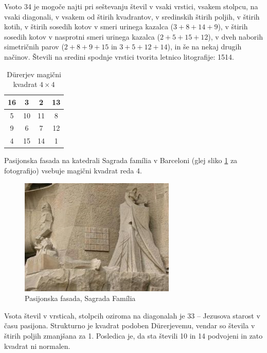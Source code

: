 \documentclass[a4paper,12pt]{article}
\theoremstyle{definition}
\begin{document}
Vsoto 34 je mogoče najti pri seštevanju števil v vsaki vrstici, vsakem stolpcu,
na vsaki diagonali, v vsakem od štirih kvadrantov, v sredinskih štirih poljih,
v štirih kotih, v štirih sosedih kotov v smeri urinega kazalca ($3+8+14+9$), v
štirih sosedih kotov v nasprotni smeri urinega kazalca ($2+5+15+12$), v dveh naborih
simetričnih parov ($2+8+9+15$ in $3+5+12+14$), in še na nekaj drugih načinov.
Števili na sredini spodnje vrstici tvorita letnico litografije: 1514.
%
\begin{table}[h!]
   \centering
   \caption{Dürerjev magični kvadrat $4\times 4$}
   \label{durer}
   \begin{tabular}{|c|c|c|c|}
      \hline
      16 &  3 &  2 & 13 \\\hline
       5 & 10 & 11 &  8 \\\hline
       9 &  6 &  7 & 12 \\\hline
       4 & 15 & 14 &  1 \\\hline
   \end{tabular}
\end{table}

Pasijonska fasada na katedrali Sagrada família v Barceloni
(glej sliko \ref{fig:sagrada} za fotografijo) vsebuje magični kvadrat reda 4.

\begin{figure}[h!]
   \centering
   \caption{Pasijonska fasada, Sagrada Família}
   \label{fig:sagrada}
   \includegraphics[scale=0.5]{sagrada.png}
\end{figure}

Vsota števil v vrsticah, stolpcih oziroma na diagonalah je 33 -- Jezusova starost
v času pasijona. Strukturno je kvadrat podoben Dürerjevemu, vendar so števila
v štirih poljih zmanjšana za 1. Posledica je, da sta števili 10 in 14 podvojeni
in zato kvadrat ni normalen.
%
\end{document}
